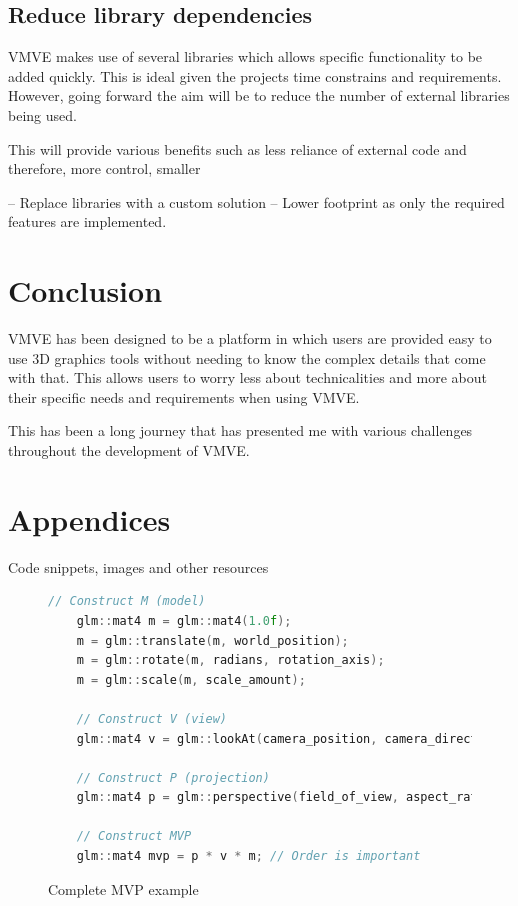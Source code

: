 \documentclass[11pt]{article}
\begin{document}
\subsection{Reduce library dependencies}
VMVE makes use of several libraries which allows specific functionality to be
added quickly. This is ideal given the projects time constrains and
requirements. However, going forward the aim will be to reduce the number of
external libraries being used.

This will provide various benefits such as less reliance of external code and
therefore, more control, smaller 


-- Replace libraries with a custom solution --
Lower footprint as only the required features are implemented.

\section{Conclusion}

VMVE has been designed to be a platform in which users are provided easy to use
3D graphics tools without needing to know the complex details that come with
that. This allows users to worry less about technicalities and more about their
specific needs and requirements when using VMVE.

This has been a long journey that has presented me with various challenges
throughout the development of VMVE.


\clearpage
\printglossary

\clearpage
\printglossary[type=\acronymtype]






\section{Appendices}
Code snippets, images and other resources



\begin{figure}[ht]
  \centering
  \begin{lstlisting}[language=C++]
    // Construct M (model)
    glm::mat4 m = glm::mat4(1.0f);
    m = glm::translate(m, world_position);   
    m = glm::rotate(m, radians, rotation_axis); 
    m = glm::scale(m, scale_amount);

    // Construct V (view)
    glm::mat4 v = glm::lookAt(camera_position, camera_direction, camera_up);

    // Construct P (projection)
    glm::mat4 p = glm::perspective(field_of_view, aspect_ratio, near, far);

    // Construct MVP
    glm::mat4 mvp = p * v * m; // Order is important

  \end{lstlisting}
  \caption{Complete MVP example}
  \label{fig:local_to_world_appendix}
\end{figure}
\end{document}

